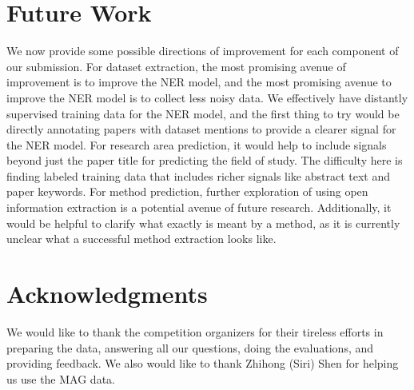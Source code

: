 \section{Future Work}
We now provide some possible directions of improvement for each component of our submission. For dataset extraction, the most promising avenue of improvement is to improve the NER model, and the most promising avenue to improve the NER model is to collect less noisy data. We effectively have distantly supervised training data for the NER model, and the first thing to try would be directly annotating papers with dataset mentions to provide a clearer signal for the NER model. For research area prediction, it would help to include signals beyond just the paper title for predicting the field of study. The difficulty here is finding labeled training data that includes richer signals like abstract text and paper keywords. For method prediction, further exploration of using open information extraction is a potential avenue of future research. Additionally, it would be helpful to clarify what exactly is meant by a method, as it is currently unclear what a successful method extraction looks like.

\section*{Acknowledgments}
We would like to thank the competition organizers for their tireless efforts in preparing the data, answering all our questions, doing the evaluations, and providing feedback.
We also would like to thank Zhihong (Siri) Shen for helping us use the MAG data.







